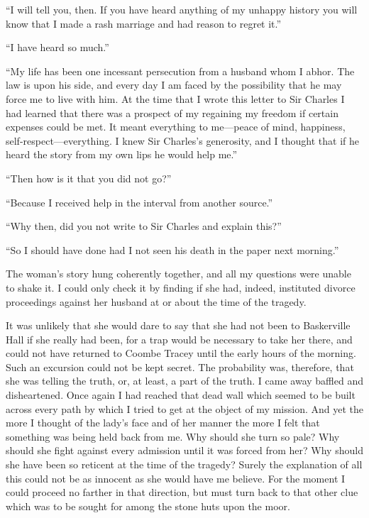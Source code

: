 \documentclass[paper=5.5in:8.5in,BCOR=7mm,twoside,DIV=calc,12pt,usegeometry,openany,chapterprefix,endperiod]{scrbook} %
\begin{document}
\enquote{I will tell you, then. If you have heard anything of my unhappy history you will know that I made a rash marriage and had reason to regret it.}

\enquote{I have heard so much.}

\enquote{My life has been one incessant persecution from a husband whom I abhor. The law is upon his side, and every day I am faced by the possibility that he may force me to live with him. At the time that I wrote this letter to Sir Charles I had learned that there was a prospect of my regaining my freedom if certain expenses could be met. It meant everything to me\nobreakdash---peace of mind, happiness, self-respect\nobreakdash---everything. I knew Sir Charles's generosity, and I thought that if he heard the story from my own lips he would help me.}

\enquote{Then how is it that you did not go?}

\enquote{Because I received help in the interval from another source.}

\enquote{Why then, did you not write to Sir Charles and explain this?}

\enquote{So I should have done had I not seen his death in the paper next morning.}

The woman's story hung coherently together, and all my questions were unable to shake it. I could only check it by finding if she had, indeed, instituted divorce proceedings against her husband at or about the time of the tragedy.


It was unlikely that she would dare to say that she had not been to Baskerville Hall if she really had been, for a trap would be necessary to take her there, and could not have returned to Coombe Tracey until the early hours of the morning. Such an excursion could not be kept secret. The probability was, therefore, that she was telling the truth, or, at least, a part of the truth. I came away baffled and disheartened. Once again I had reached that dead wall which seemed to be built across every path by which I tried to get at the object of my mission. And yet the more I thought of the lady's face and of her manner the more I felt that something was being held back from me. Why should she turn so pale? Why should she fight against every admission until it was forced from her? Why should she have been so reticent at the time of the tragedy? Surely the explanation of all this could not be as innocent as she would have me believe. For the moment I could proceed no farther in that direction, but must turn back to that other clue which was to be sought for among the stone huts upon the moor.
\end{document}
